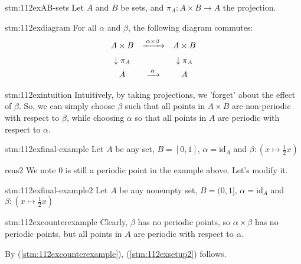 \begin{statement}{stm:112exAB-sets}
Let $A$ and $B$ be sets, and $\pi_A\colon A \times B \to A$ the projection.
\end{statement}

\begin{statement}{stm:112exdiagram}
For all $\alpha$ and $\beta$, the following diagram commutes:
\[
\begin{array}{c@{\quad}c@{\quad}c}
A \times B & \xrightarrow{\;\alpha \times \beta\;} & A \times B\\[6pt]
\downarrow{\pi_A} && \downarrow{\pi_A}\\[4pt]
A & \xrightarrow{\;\alpha\;} & A
\end{array}
\]
\end{statement}

\begin{explanation}{stm:112exintuition}
Intuitively, by taking projections, we 'forget' about the effect of $\beta$. So, we can simply choose $\beta$ such that all points in $A \times B$ are non-periodic with respect to $\beta$, while choosing $\alpha$ so that all points in $A$ are periodic with respect to $\alpha$. 
\end{explanation}

\begin{explanation}{stm:112exfinal-example}
Let $A$ be any set, $B = [0,1]$, $\alpha = \mathrm{id}_A$ and $\beta: (x \mapsto \frac{1}{2}x)$
\end{explanation}

\begin{explanation}{reas2}
We note $0$ is still a periodic point in the example above. Let's modify it.
\end{explanation}

\begin{statement}{stm:112exfinal-example2}
    Let $A$ be any nonempty set, $B = (0,1]$, $\alpha = \mathrm{id}_A$ and $\beta: (x \mapsto \frac{1}{2}x)$
\end{statement}
    
\begin{statement}{stm:112excounterexample}
Clearly, $\beta$ has no periodic points, so $\alpha \times \beta$ has no periodic points, but all points in $A$ are periodic with respect to $\alpha$. 
\end{statement}

\begin{statement}{}
By (\ref{stm:112excounterexample}), (\ref{stm:112exsetup2}) follows.
\end{statement}